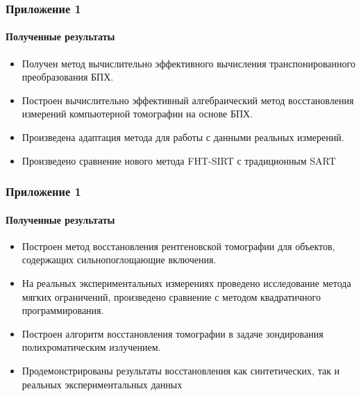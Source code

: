 \documentclass[12pt]{beamer}
\begin{document}
\begin{frame}
\frametitle{Приложение 1}
\framesubtitle{Полученные результаты}
\begin{itemize}
  \item Получен метод вычислительно эффективного вычисления транспонированного преобразования БПХ.
  \item Построен вычислительно эффективный алгебраический метод восстановления измерений компьютерной томографии на основе БПХ.
  \item Произведена адаптация метода для работы с данными реальных измерений. \item Произведено сравнение нового метода FHT-SIRT с традиционным SART
\end{itemize}
\end{frame}

\begin{frame}
\frametitle{Приложение 1}
\framesubtitle{Полученные результаты}
\begin{itemize}
  \item Построен метод восстановления рентгеновской томографии для объектов, содержащих сильнопоглощающие включения. 
  \item На реальных экспериментальных измерениях проведено исследование метода мягких ограничений, произведено сравнение с методом квадратичного программирования.
  \item Построен алгоритм восстановления томографии в задаче зондирования полихроматическим излучением. 
  \item Продемонстрированы результаты восстановления как синтетических, так и реальных экспериментальных данных
\end{itemize}
\end{frame}
\end{document}
